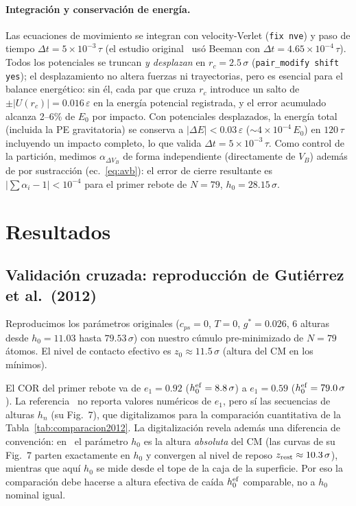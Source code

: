 \documentclass[12pt,a4paper]{article}
\newcommand{\eps}{\varepsilon}
\newcommand{\gstar}{g^*}
\begin{document}
\paragraph{Integración y conservación de energía.}
Las ecuaciones de movimiento se integran con velocity-Verlet
(\texttt{fix nve}) y paso de tiempo $\Delta t = 5\times10^{-3}\,\tau$
(el estudio original~\cite{Gutierrez2012} usó Beeman con
$\Delta t = 4.65\times10^{-4}\,\tau$). Todos los potenciales se truncan
\emph{y desplazan} en $r_c=2.5\,\sigma$ (\texttt{pair\_modify shift yes});
el desplazamiento no altera fuerzas ni trayectorias, pero es esencial para
el balance energético: sin él, cada par que cruza $r_c$ introduce un salto
de $\pm|U(r_c)|=0.016\,\eps$ en la energía potencial registrada, y el error
acumulado alcanza 2--6\% de $E_0$ por impacto. Con potenciales desplazados,
la energía total (incluida la PE gravitatoria) se conserva a
$|\Delta E|<0.03\,\eps$ ($\sim4\times10^{-4}\,E_0$) en $120\,\tau$
incluyendo un impacto completo, lo que valida $\Delta t=5\times10^{-3}\,\tau$.
Como control de la partición, medimos $\alpha_{\Delta V_B}$ de forma
independiente (directamente de $V_B$) además de por sustracción
(ec.~\eqref{eq:avb}): el error de cierre resultante es
$|\sum\alpha_i-1|<10^{-4}$ para el primer rebote de $N=79$,
$h_0=28.15\,\sigma$.

\section{Resultados}
\label{sec:resultados}

\subsection{Validación cruzada: reproducción de Gutiérrez et al.\ (2012)}
\label{sec:reproduccion}

Reproducimos los parámetros originales ($c_{ps}=0$, $T=0$, $\gstar=0.026$,
6 alturas desde $h_0=11.03$ hasta $79.53\,\sigma$) con nuestro cúmulo
pre-minimizado de $N=79$ átomos. El nivel de contacto efectivo es
$z_0\approx11.5\,\sigma$ (altura del CM en los mínimos).

El COR del primer rebote va de $e_1=0.92$ ($h_0^{\rm ef}=8.8\,\sigma$) a
$e_1=0.59$ ($h_0^{\rm ef}=79.0\,\sigma$). La referencia~\cite{Gutierrez2012}
no reporta valores numéricos de $e_1$, pero sí las secuencias de alturas
$h_n$ (su Fig.~7), que digitalizamos para la comparación cuantitativa de la
Tabla~\ref{tab:comparacion2012}. La digitalización revela además una
diferencia de convención: en~\cite{Gutierrez2012} el parámetro $h_0$ es la
altura \emph{absoluta} del CM (las curvas de su Fig.~7 parten exactamente
en $h_0$ y convergen al nivel de reposo $z_{\rm rest}\approx10.3\,\sigma$),
mientras que aquí $h_0$ se mide desde el tope de la caja de la superficie.
Por eso la comparación debe hacerse a altura efectiva de caída
$h_0^{\rm ef}$ comparable, no a $h_0$ nominal igual.
\end{document}
